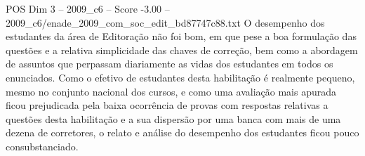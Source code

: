\begin{textsample}{POS Dim 3 – 2009\_c6 – Score -3.00 – 2009\_c6/enade\_2009\_com\_soc\_edit\_bd87747c88.txt}
O desempenho dos estudantes da área de Editoração não foi bom, em que pese a boa formulação das questões e a relativa simplicidade das chaves de correção, bem como a abordagem de assuntos que perpassam diariamente as vidas dos estudantes em todos os enunciados.
Como o efetivo de estudantes desta habilitação é realmente pequeno, mesmo no conjunto nacional dos cursos, e como uma avaliação mais apurada ficou prejudicada pela baixa ocorrência de provas com respostas relativas a questões desta habilitação e a sua dispersão por uma banca com mais de uma dezena de corretores, o relato e análise do desempenho dos estudantes ficou pouco consubstanciado.

\end{textsample}
